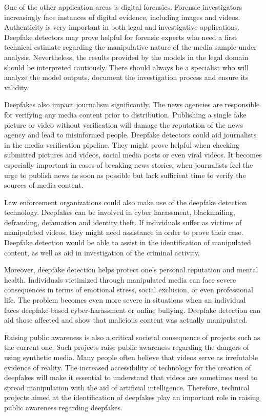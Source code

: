\documentclass[12pt,a4paper]{report}
\begin{document}
One of the other application areas is digital forensics. Forensic investigators increasingly face instances of digital evidence, including images and videos. Authenticity is very important in both legal and investigative applications. Deepfake detectors may prove helpful for forensic experts who need a first technical estimate regarding the manipulative nature of the media sample under analysis. Nevertheless, the results provided by the models in the legal domain should be interpreted cautiously. There should always be a specialist who will analyze the model outputs, document the investigation process and ensure its validity.

Deepfakes also impact journalism significantly. The news agencies are responsible for verifying any media content prior to distribution. Publishing a single fake picture or video without verification will damage the reputation of the news agency and lead to misinformed people. Deepfake detectors could aid journalists in the media verification pipeline. They might prove helpful when checking submitted pictures and videos, social media posts or even viral videos. It becomes especially important in cases of breaking news stories, when journalists feel the urge to publish news as soon as possible but lack sufficient time to verify the sources of media content.

Law enforcement organizations could also make use of the deepfake detection technology. Deepfakes can be involved in cyber harassment, blackmailing, defrauding, defamation and identity theft. If individuals suffer as victims of manipulated videos, they might need assistance in order to prove their case. Deepfake detection would be able to assist in the identification of manipulated content, as well as aid in investigation of the criminal activity.

Moreover, deepfake detection helps protect one’s personal reputation and mental health. Individuals victimized through manipulated media can face severe consequences in terms of emotional stress, social exclusion, or even professional life. The problem becomes even more severe in situations when an individual faces deepfake-based cyber-harassment or online bullying. Deepfake detection can aid those affected and show that malicious content was actually manipulated.

Raising public awareness is also a critical societal consequence of projects such as the current one. Such projects raise public awareness regarding the dangers of using synthetic media. Many people often believe that videos serve as irrefutable evidence of reality. The increased accessibility of technology for the creation of deepfakes will make it essential to understand that videos are sometimes used to spread manipulation with the aid of artificial intelligence. Therefore, technical projects aimed at the identification of deepfakes play an important role in raising public awareness regarding deepfakes.
\end{document}
